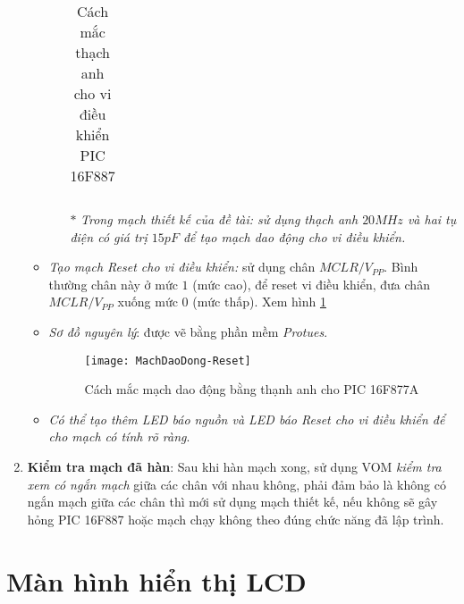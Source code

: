 \begin{enumerate}[{\bf a.}]
\begin{itemize}
\begin{itemize}
\begin{table}[h]
\begin{center}
\begin{tabular}{|c|l|}
\end{tabular}
\end{center}
\caption{Cách mắc thạch anh cho vi điều khiển PIC 16F887}
\end{table}
\item[$\ast$] \textit{Trong mạch thiết kế của đề tài: sử dụng thạch anh $20MHz$ và hai tụ điện có giá trị $15pF$ để tạo mạch dao động cho vi điều khiển.}
\end{itemize}
\item \textit{Tạo mạch Reset cho vi điều khiển:} sử dụng chân $MCLR/V_{PP}$. Bình thường chân này ở mức $1$ (mức cao), để reset vi điều khiển, đưa chân $MCLR/V_{PP}$ xuống mức $0$ (mức thấp). Xem hình \ref{fmachdaodongreset}
\item \textit{Sơ đồ nguyên lý}: được vẽ bằng phần mềm \emph{Protues}.
\begin{figure}[h]
\begin{center}
\texttt{[image: MachDaoDong-Reset]}
\end{center}
\caption{Cách mắc mạch dao động bằng thạnh anh cho PIC 16F877A} \label{fmachdaodongreset}
\end{figure}
\item \textit{Có thể tạo thêm LED báo nguồn và LED báo Reset cho vi điều khiển để cho mạch có tính rõ ràng}.
\end{itemize}
\item \textbf{Kiểm tra mạch đã hàn}: Sau khi hàn mạch xong, sử dụng VOM \textit{kiểm tra xem có ngắn mạch} giữa các chân với nhau không, phải đảm bảo là không có ngắn mạch giữa các chân thì mới sử dụng mạch thiết kế, nếu không sẽ gây hỏng PIC 16F887 hoặc mạch chạy không theo đúng chức năng đã lập trình.
\end{enumerate}
\section{Màn hình hiển thị LCD}
